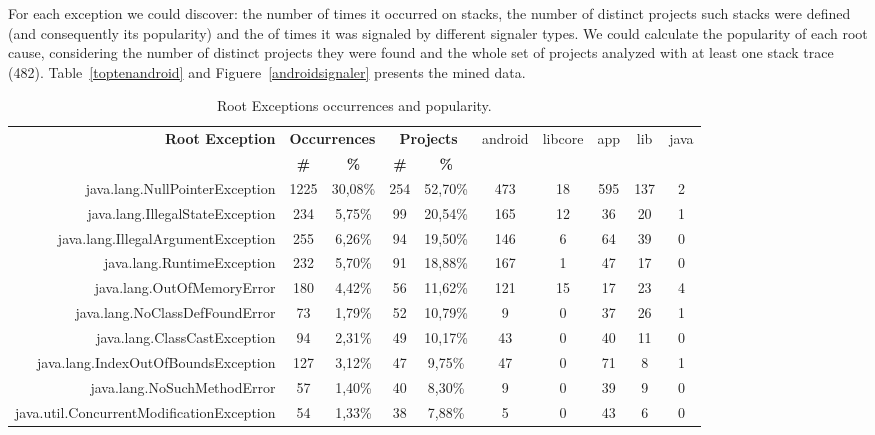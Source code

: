\documentclass[conference]{IEEEtran}
\begin{document}
For each exception we could discover: the number of times it occurred on stacks, the number of distinct projects such stacks were defined (and consequently its popularity) and the of times it was signaled by different signaler types. We could calculate the popularity of each root cause, considering the number of distinct projects they were found and the whole set of projects analyzed with at least one stack trace (482). Table~\ref{toptenandroid} and Figuere~\ref{androidsignaler} presents the mined data.

\begin{table}
  \centering
  \begin{tabular}{rccccccccc}
    \hline
    \bfseries{Root Exception} &  \multicolumn{2}{c}{\bfseries{Occurrences}} &  \multicolumn{2}{c}{\bfseries{Projects}} & \textsf{android} & \textsf{libcore} & \textsf{app} & \textsf{lib} & \textsf{java} \\
    & \bfseries{\#} &  \bfseries{\%} & \bfseries{\# } & \bfseries{\% } &&&&&\\
    \hline
java.lang.NullPointerException	            & 1225  &   30,08\% &	254	&	52,70\%	&	473	&	18	&	595	&	137	&	2	\\
java.lang.IllegalStateException	            & 234	&   5,75\%  &	99	&	20,54\%	&	165	&	12	&	36	&	20	&	1	\\
java.lang.IllegalArgumentException	        & 255	&   6,26\%  &	94	&	19,50\%	&	146	&	6	&	64	&	39	&	0	\\
java.lang.RuntimeException	                & 232	&   5,70\%  &	91	&	18,88\%	&	167	&	1	&	47	&	17	&	0	\\
java.lang.OutOfMemoryError	                & 180	&   4,42\%  &   56	&	11,62\%	&	121	&	15	&	17	&	23	&	4	\\
java.lang.NoClassDefFoundError	            & 73	&   1,79\%  &	52	&	10,79\%	&	9	&	0	&	37	&	26	&	1	\\
java.lang.ClassCastException	            & 94	&   2,31\%  &	49	&	10,17\%	&	43	&	0	&	40	&	11	&	0	\\
java.lang.IndexOutOfBoundsException	        & 127	&   3,12\%  &	47	&	9,75\%	&	47	&	0	&	71	&	8	&	1	\\
java.lang.NoSuchMethodError	                & 57	&   1,40\%  &	40	&	8,30\%	&	9	&	0	&	39	&	9	&	0	\\
java.util.ConcurrentModificationException   & 54	&   1,33\%  &	38	&	7,88\%	&	5	&	0	&	43	&	6	&	0	\\

    \hline
  \end{tabular}
\caption{Root Exceptions occurrences and popularity.}
\label{tab:toptenandroid}
\end{table}
\end{document}
